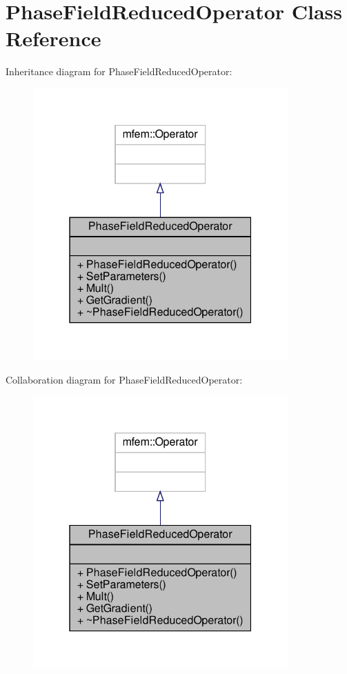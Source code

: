 \hypertarget{classPhaseFieldReducedOperator}{}\section{Phase\+Field\+Reduced\+Operator Class Reference}
\label{classPhaseFieldReducedOperator}


Inheritance diagram for Phase\+Field\+Reduced\+Operator\+:\nopagebreak
\begin{figure}[H]
\begin{center}
\leavevmode
\includegraphics[width=277pt]{classPhaseFieldReducedOperator__inherit__graph}
\end{center}
\end{figure}


Collaboration diagram for Phase\+Field\+Reduced\+Operator\+:\nopagebreak
\begin{figure}[H]
\begin{center}
\leavevmode
\includegraphics[width=277pt]{classPhaseFieldReducedOperator__coll__graph}
\end{center}
\end{figure}
